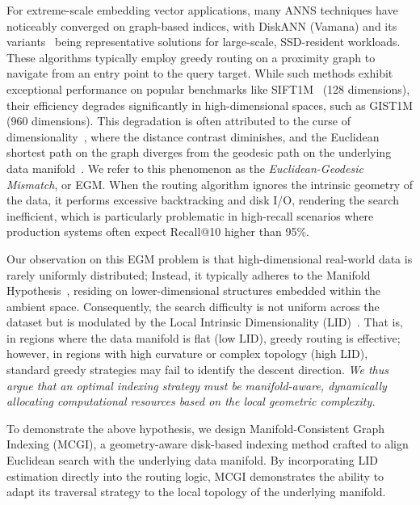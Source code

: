 \documentclass{article}
\theoremstyle{plain}
\theoremstyle{definition}
\theoremstyle{remark}
\begin{document}
For extreme-scale embedding vector applications, many ANNS techniques have noticeably converged on graph-based indices, with DiskANN (Vamana) and its variants~\cite{subramanya2019diskann,chen2021spann,osdi25pipeann,fast26odinann} being representative solutions for large-scale, SSD-resident workloads. These algorithms typically employ greedy routing on a proximity graph to navigate from an entry point to the query target. While such methods exhibit exceptional performance on popular benchmarks like SIFT1M~\cite{jegou2011product} (128 dimensions), their efficiency degrades significantly in high-dimensional spaces, such as GIST1M (960 dimensions). This degradation is often attributed to the curse of dimensionality~\cite{bellman1957dynamic}, where the distance contrast diminishes, and the Euclidean shortest path on the graph diverges from the geodesic path on the underlying data manifold~\cite{tenenbaum2000global,NEURIPS2023_d0ac28b7}. We refer to this phenomenon as the \emph{Euclidean-Geodesic Mismatch}, or EGM. When the routing algorithm ignores the intrinsic geometry of the data, it performs excessive backtracking and disk I/O, rendering the search inefficient, which is particularly problematic in high-recall scenarios where production systems often expect Recall@10 higher than 95\%.

Our observation on this EGM problem is that high-dimensional real-world data is rarely uniformly distributed; Instead, it typically adheres to the Manifold Hypothesis~\cite{tenenbaum2000global,roweis2000nonlinear}, residing on lower-dimensional structures embedded within the ambient space. Consequently, the search difficulty is not uniform across the dataset but is modulated by the Local Intrinsic Dimensionality (LID)~\cite{NIPS2004_74934548}. That is, in regions where the data manifold is flat (low LID), greedy routing is effective; however, in regions with high curvature or complex topology (high LID), standard greedy strategies may fail to identify the descent direction. 
\emph{We thus argue that an optimal indexing strategy must be manifold-aware, dynamically allocating computational resources based on the local geometric complexity.}

To demonstrate the above hypothesis, we design Manifold-Consistent Graph Indexing (MCGI), a geometry-aware disk-based indexing method crafted to align Euclidean search with the underlying data manifold. By incorporating LID estimation directly into the routing logic, MCGI demonstrates the ability to adapt its traversal strategy to the local topology of the underlying manifold. 
\end{document}
